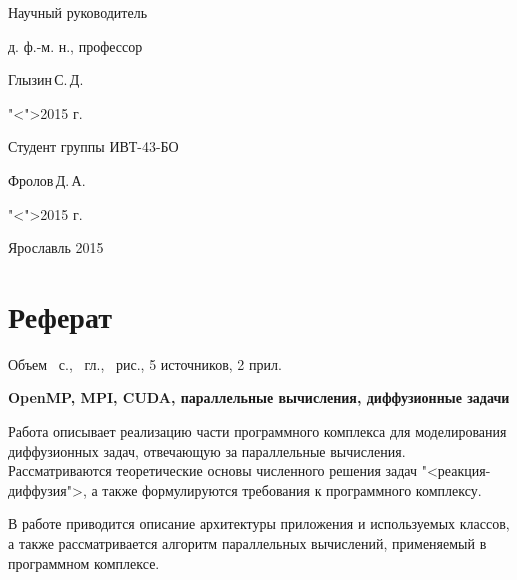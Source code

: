 \documentclass[a4paper, 14pt]{extarticle}
\theoremstyle{definition}
\begin{document}
{\medskip

\begin{flushright}
	Научный руководитель\par
	д. ф.-м. н., профессор\par
	\underline{\hspace{3.5cm}}Глызин\,С.\,Д.\par
	"<\underline{\hspace{0.8cm}}">\underline{\hspace{3.5cm}}2015 г.\par
\end{flushright}

\bigskip 

\begin{flushright}
	Студент группы ИВТ-43-БО\par
	\underline{\hspace{2.5cm}}Фролов\,Д.\,А.\par
	"<\underline{\hspace{0.8cm}}">\underline{\hspace{3.5cm}}2015 г.\par
\end{flushright}

\vspace{\fill}

\begin{center}
	Ярославль 2015
\end{center}

\clearpage
}



\section*{Реферат}
\noindent Объем \pageref*{LastPage}~с., 
\totsections~гл., \totfig~рис., 
5 источников, 2 прил. 

\noindent\textbf{OpenMP, MPI, CUDA, параллельные вычисления, диффузионные задачи}


\par Работа описывает реализацию части программного комплекса для моделирования диффузионных задач, отвечающую за параллельные вычисления. Рассматриваются теоретические основы численного решения задач "<реакция-диффузия">, а также формулируются требования к программного комплексу.

\par В работе приводится описание архитектуры приложения и используемых классов, а также рассматривается алгоритм параллельных вычислений, применяемый в программном комплексе.
\end{document}
